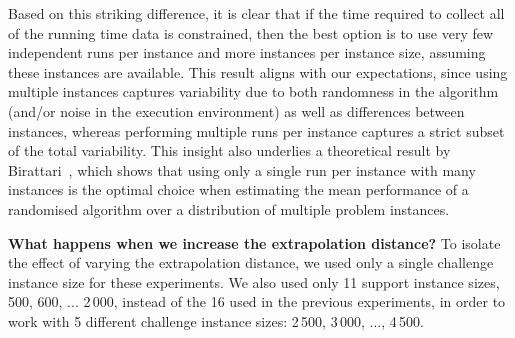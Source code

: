 \documentclass[aic]{iosart2x}
\begin{document}
Based on this striking difference, it is clear that if the time required to collect all of the running time data is constrained, then the best option is to use very few independent runs per instance and more instances per instance size, assuming these instances are available. This result aligns with our expectations, since using multiple instances captures variability due to both randomness in the algorithm (and/or noise in the execution environment) as well as differences between instances, whereas performing multiple runs per instance captures a strict subset of the total variability. This insight also underlies a theoretical result by Birattari~\cite{Bir04}, which shows that using only a single run per instance with many instances is the optimal choice when estimating the mean performance of a randomised algorithm over a distribution of multiple problem instances. 

\textbf{What happens when we increase the extrapolation distance?}
To isolate the effect of varying the extrapolation distance, we used only a single challenge instance size for these experiments. 
We also used only 11 support instance sizes, 500, 600, ... 2\,000, instead of the 16 used in the previous experiments, in order to work with 5 different challenge instance sizes: 2\,500, 3\,000, ..., 4\,500.
\end{document}
